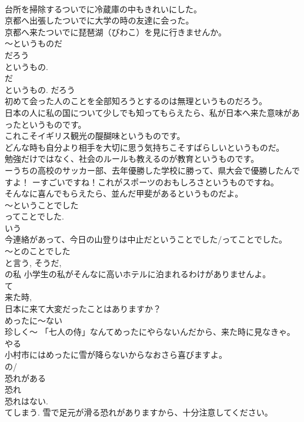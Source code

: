 \documentclass[8pt]{extreport}
\begin{document}
\begin{CJK}{UTF8}{min}
\\	台所を掃除するついでに冷蔵庫の中もきれいにした。 
\\	京都へ出張したついでに大学の時の友達に会った。 
\\	京都へ来たついでに琵琶湖（びわこ）を見に行きませんか。 
\\	～というものだ	
\\	だろう 
\\	というもの. 
\\	だ 
\\	というもの. だろう 
\\	初めて会った人のことを全部知ろうとするのは無理というものだろう。 
\\	日本の人に私の国について少しでも知ってもらえたら、私が日本へ来た意味があったというものです。 
\\	これこそイギリス観光の醍醐味というものです。 
\\	どんな時も自分より相手を大切に思う気持ちこそすばらしいというものだ。 
\\	勉強だけではなく、社会のルールも教えるのが教育というものです。 
\\	ーうちの高校のサッカー部、去年優勝した学校に勝って、県大会で優勝したんですよ！ ーすごいですね！これがスポーツのおもしろさというものですね。 
\\	そんなに喜んでもらえたら、並んだ甲斐があるというものだよ。 
\\	～ということでした 
\\	ってことでした. 
\\	いう 
\\	今連絡があって、今日の山登りは中止だということでした/ってことでした。 
\\	～とのことでした 
\\	と言う, そうだ, 
\\	の私	小学生の私がそんなに高いホテルに泊まれるわけがありませんよ。 
\\	て 
\\	来た時, 
\\	日本に来て大変だったことはありますか？ 
\\	めったに～ない	
\\	珍しく～ 「七人の侍」なんてめったにやらないんだから、来た時に見なきゃ。 やる 
\\	小村市にはめったに雪が降らないからなおさら喜びますよ。 
\\	の/
\\	恐れがある	
\\	恐れ 
\\	恐れはない. 
\\	てしまう. 雪で足元が滑る恐れがありますから、十分注意してください。 

\end{CJK}
\end{document}
